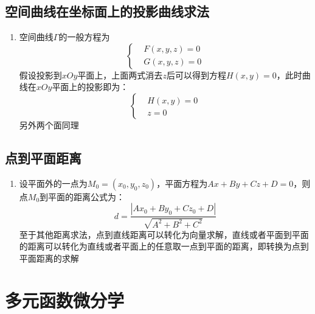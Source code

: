 \documentclass[12pt,a4paper,UTF8]{book}
\begin{document}
\subsection{空间曲线在坐标面上的投影曲线求法}
\begin{enumerate}
\item 空间曲线$\Gamma$的一般方程为
\[\left\{\begin{aligned}&F\left(x,y,z\right)=0\\&G\left(x,y,z\right)=0\end{aligned}\right.\]
假设投影到$xOy$平面上，上面两式消去$z$后可以得到方程$H\left(x,y\right)=0$，此时曲线在$xOy$平面上的投影即为：
\[\left\{\begin{aligned}&H\left(x,y\right)=0\\&z=0\end{aligned}\right.\]
另外两个面同理
\end{enumerate}

\subsection{点到平面距离}
\begin{enumerate}
\item 设平面外的一点为$M_0=\left(x_0,y_0,z_0\right)$，平面方程为$Ax+By+Cz+D=0$，则点$M_0$到平面的距离公式为：
\[d=\frac{\left|Ax_0+By_0+Cz_0+D\right|}{\sqrt{A^2+B^2+C^2}}\]
至于其他距离求法，点到直线距离可以转化为向量求解，直线或者平面到平面的距离可以转化为直线或者平面上的任意取一点到平面的距离，即转换为点到平面距离的求解
\end{enumerate}


\section{多元函数微分学}
\end{document}
